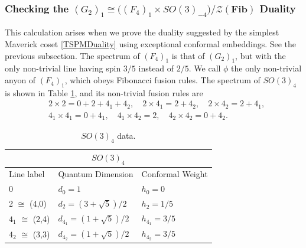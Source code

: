 \documentclass[11pt]{article}
\numberwithin{equation}{section}
\begin{document}
\subsubsection{Checking the $(G_{2})_{1} \cong \big( (F_{4})_{1} \times SO(3)_{-4} \big)/\mathcal{Z}(\mathbf{Fib})$ Duality} \label{ExampleforsimplestMaverick}

This calculation arises when we prove the duality suggested by the simplest Maverick coset \eqref{TSPMDuality} using exceptional conformal embeddings. See the previous subsection. The spectrum of $(F_{4})_{1}$ is that of $(G_{2})_{1}$, but with the only non-trivial line having spin $3/5$ instead of $2/5$. We call $\phi$ the only non-trivial anyon of $(F_{4})_{1}$, which obeys Fibonacci fusion rules. The spectrum of $SO(3)_{4}$ is shown in Table \ref{so3lv4table}, and its non-trivial fusion rules are
\begin{align} \label{so3lv4fusionrules}
    &2 \times 2 = 0+2+4_{1}+4_{2}, \quad 2 \times 4_{1} = 2 + 4_{2}, \quad 2 \times 4_{2} = 2 + 4_{1}, \nonumber \\[0.3cm]
    &4_{1} \times 4_{1} = 0 + 4_{1}, \quad 4_{1} \times 4_{2} = 2, \quad 4_{2} \times 4_{2} = 0 + 4_{2}.
\end{align}

\begin{table}[t]
\centering
\begin{tabular}[h]{|p{4cm}|p{4cm}|p{4cm}| }
\hline 
\multicolumn{3}{|c|}{$SO(3)_{4}$} \\
\hline
Line label & Quantum Dimension & Conformal Weight \\
\hline
0 & $d_{0}=1$ & $h_{0}=0$ \\
2 $\cong$ (4,0) & $d_{2} = (3+\sqrt{5})/2$ & $h_{2}=1/5$ \\
$4_{1}$ $\cong$ (2,4) & $d_{4_{1}} = (1 + \sqrt{5})/2$ & $h_{4_{1}}=3/5$ \\
$4_{2}$ $\cong$ (3,3) & $d_{4_{2}} = (1 + \sqrt{5})/2$ & $h_{4_{2}}=3/5$ \\
\hline
\end{tabular}
\caption{$SO(3)_{4}$ data.}  \label{so3lv4table}
\end{table}
\end{document}
